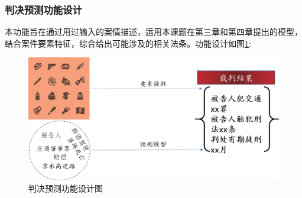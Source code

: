 \subsubsection{判决预测功能设计}
本功能旨在通过用过输入的案情描述，运用本课题在第三章和第四章提出的模型，结合案件要素特征，综合给出可能涉及的相关法条。功能设计如图\ref{fig:sys_picture}:
\begin{figure}[htbp]%
    \centering
    \includegraphics[scale=0.5, clip=true]{./sources/sys_picture.eps}
    \caption{\label{fig:sys_picture}判决预测功能设计图}
\end{figure}



